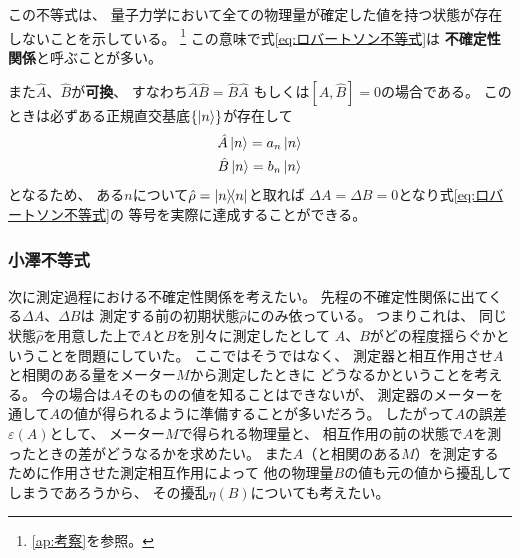 \documentclass[a4paper, 10pt, uplatex]{jsarticle}
\begin{document}
\pagebreak		%
この不等式は、
量子力学において全ての物理量が確定した値を持つ状態が存在しないことを示している。
\footnote{\ref{ap:考察}を参照。}
この意味で式\eqref{eq:ロバートソン不等式}は
\textbf{不確定性関係}と呼ぶことが多い。

また$\hat{A}$、$\hat{B}$が\textbf{可換}、
すなわち$\hat{A} \hat{B} = \hat{B} \hat{A}$
もしくは$\left[ \hat{A}, \hat{B} \right] = 0$の場合である。
このときは必ずある正規直交基底$\{ \Ket{n} \}$が存在して
\begin{gather}
	\hat{A} \Ket{n} = a_n \Ket{n} \\
	\hat{B} \Ket{n} = b_n \Ket{n}
\end{gather}
となるため、
ある$n$について$\hat{\rho} = \Ket{n} \! \! \Bra{n}$と取れば
$\Delta A = \Delta B = 0$となり式\eqref{eq:ロバートソン不等式}の
等号を実際に達成することができる。
\footnotemark[1]

\subsubsection{小澤不等式}
次に測定過程における不確定性関係を考えたい。
先程の不確定性関係に出てくる$\Delta A$、$\Delta B$は
測定する前の初期状態$\hat{\rho}$にのみ依っている。
つまりこれは、
同じ状態$\hat{\rho}$を用意した上で$A$と$B$を別々に測定したとして
$A$、$B$がどの程度揺らぐかということを問題にしていた。
ここではそうではなく、
測定器と相互作用させ$A$と相関のある量をメーター$M$から測定したときに
どうなるかということを考える。
今の場合は$A$そのものの値を知ることはできないが、
測定器のメーターを通して$A$の値が得られるように準備することが多いだろう。
したがって$A$の誤差$\varepsilon (A)$として、
メーター$M$で得られる物理量と、
相互作用の前の状態で$A$を測ったときの差がどうなるかを求めたい。
また$A$（と相関のある$M$）を測定するために作用させた測定相互作用によって
他の物理量$B$の値も元の値から擾乱してしまうであろうから、
その擾乱$\eta (B)$についても考えたい。
\end{document}

